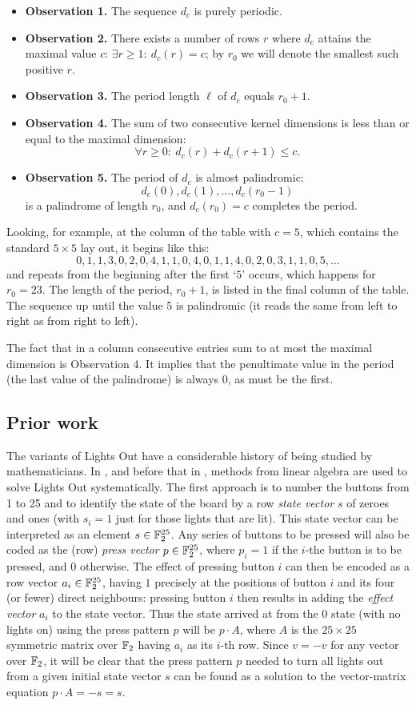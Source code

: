 \begin{itemize}
\item{\bf Observation 1.}
The sequence $d_c$ is purely periodic. %
\item{\bf Observation 2.}
There exists a number of rows $r$ where $d_c$ attains the maximal value $c$:
$\exists r\geq 1:\ d_c(r)=c$; by $r_0$ we will denote the
smallest such positive $r$.
\item{\bf Observation 3.}
The period length $\ell$ of $d_c$ equals $r_0+1$.
\item{\bf Observation 4.}
The sum of two consecutive kernel dimensions 
is less than or equal to the maximal dimension:
$$\forall r\geq0:\ d_c(r)+d_c(r+1)\leq c.$$
\item{\bf Observation 5.}
The period of $d_c$ is almost palindromic:
$$d_c(0), d_c(1), \ldots, d_c(r_0-1)$$
is a palindrome of length $r_0$, and $d_c(r_0)=c$ completes the period.
\end{itemize}
\noindent
Looking, for example, at
the column of the table with $c=5$, which contains
the standard $5\times 5$ lay out, it begins like this:
$$0,1,1,3,0,2,0,4,1,1,0,4,0,1,1,4,0,2,0,3,1,1,0,5,\ldots$$
and repeats from the beginning after the first `$5$' occurs, which
happens for $r_0=23$. The length of the period, $r_0+1$,
is listed in the final column of the table.
The sequence up until the value 5 is palindromic 
(it reads the same from left to right as from right to left).

The fact that in a column consecutive entries sum to at most the
maximal dimension is Observation 4. It implies
that the penultimate value in the period (the last value of the
palindrome) is always 0, as must be the first.

\subsection{Prior work}
The variants of Lights Out have a considerable history of
being studied by mathematicians. In \cite{anderson98}, and before that in
\cite{pelletier87}, methods from linear algebra are used to solve Lights
Out systematically.
The first approach is to number the buttons from 1 to 25 and to identify
the state of the board by a row {\it state vector} $s$ of zeroes and ones
(with $s_i=1$ just for those lights that are lit). This state vector can be
interpreted as an element $s\in\mathbb F_2^{25}$.
Any series of buttons to be pressed will also be coded as the (row) 
{\it press vector} $p\in\mathbb F_2^{25}$,
where $p_i=1$ if the $i$-the button is to be pressed, and 0 otherwise.
The effect of pressing button $i$ can then be encoded as a row vector
$a_i\in\mathbb F_2^{25}$, having $1$ precisely at the positions of button $i$
and its four (or fewer) direct neighbours: pressing button $i$ then
results in adding the {\it effect vector} $a_i$ to the state vector. Thus the state
arrived at from the 0 state (with no lights on) using the press
pattern $p$ will be $p\cdot A$, where $A$ is the $25\times 25$ 
symmetric matrix over $\mathbb F_2$ having $a_i$ as its $i$-th row.
Since $v=-v$ for any vector over $\mathbb F_2$, it will be clear
that the press pattern $p$ needed to turn all lights out
from a given initial state vector $s$ can be found as a
solution to the vector-matrix equation $p\cdot A=-s=s$.

